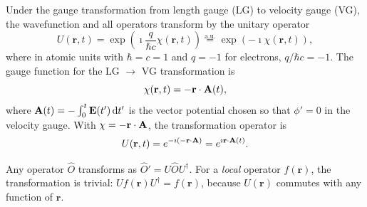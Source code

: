 Under the gauge transformation from length gauge (LG) to velocity
gauge (VG), the wavefunction and all operators transform by the
unitary operator\cite{Luber-rt-tddft,Mattiat-Luber-2022}
\begin{equation}
  U(\mathbf{r},t)
  = \exp\!\left(\imath\frac{q}{\hbar c}\chi(\mathbf{r},t)\right)
  \stackrel{\mathrm{a.u.}}{=}
  \exp(-\imath\chi(\mathbf{r},t)),
  \label{eq:U-gauge}
\end{equation}
where in atomic units with $\hbar = c = 1$ and $q = -1$ for
electrons, $q/\hbar c = -1$.
The gauge function for the LG $\to$ VG transformation is
\begin{equation}
  \chi(\mathbf{r},t) = -\mathbf{r}\cdot\mathbf{A}(t),
  \label{eq:chi-vg}
\end{equation}
where $\mathbf{A}(t) = -\int_0^t \mathbf{E}(t')\,\mathrm{d}t'$ is the
vector potential chosen so that $\phi'=0$ in the velocity
gauge.\cite{Luber-rt-tddft,rt-DFTB-Wong-2023}
With $\chi = -\mathbf{r}\cdot\mathbf{A}$, the transformation operator is
\begin{equation}
  U(\mathbf{r},t)
  = e^{-\imath(-\mathbf{r}\cdot\mathbf{A})}
  = e^{\imath\mathbf{r}\cdot\mathbf{A}(t)}.
  \label{eq:U-explicit}
\end{equation}

Any operator $\hat{O}$ transforms as $\hat{O}' = U\hat{O}U^\dag$.
For a \emph{local} operator $f(\mathbf{r})$, the transformation is
trivial: $U f(\mathbf{r})U^\dag = f(\mathbf{r})$, because
$U(\mathbf{r})$ commutes with any function of $\mathbf{r}$.

